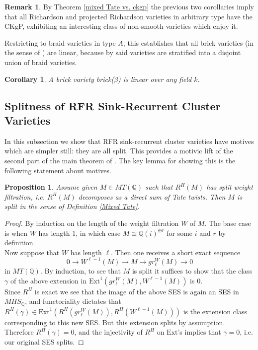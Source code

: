 \documentclass[11pt]{amsart}
\newtheorem{cor}[thm]{Corollary}
\newtheorem{prop}[thm]{Proposition}
\theoremstyle{definition}
\newtheorem{rem}[thm]{Remark}
\theoremstyle{remark}
\numberwithin{equation}{section}
\begin{document}
\begin{rem}
    By Theorem \ref{mixed Tate vs. ckgp} the previous two corollaries imply that all Richardson and projected Richardson varieties in arbitrary type have the CKgP, exhibiting an interesting class of non-smooth varieties which enjoy it.
\end{rem}

Restricting to braid varieties in type $A$, this establishes that all brick varieties (in the sense of \cite{MR3512647}) are linear, because by \cite{MR5110495} said varieties are stratified into a disjoint union of braid varieties.

\begin{cor}\label{last linear}
    A brick variety brick($\beta$) is linear over any field $k$.
\end{cor}

\subsection{Splitness of RFR Sink-Recurrent Cluster Varieties}\label{subsection 4.3}

In this subsection we show that RFR sink-recurrent cluster varieties have motives which are simpler still: they are all split. This provides a motivic lift of the second part of the main theorem of \cite{lam2022cohomology}. The key lemma for showing this is the following statement about motives.

\begin{prop}
       Assume given $M \in MT(\mathbb{Q})$ such that $R^H(M)$ has split weight filtration, i.e. $R^H(M)$ decomposes as a direct sum of Tate twists. Then $M$ is split in the sense of Definition \ref{Mixed Tate}.
\end{prop}

\begin{proof}
    By induction on the length of the weight filtration $W$ of $M$. The base case is when $W$ has length $1$, in which case $M \cong \mathbb{Q}(i)^{\oplus r}$ for some $i$ and $r$ by definition.\\
    
    Now suppose that $W$ has length $\ell$. Then one receives a short exact sequence \begin{equation}
        0 \rightarrow W^{\ell-1}(M) \rightarrow M \rightarrow gr_\ell^W(M) \rightarrow 0
\end{equation}\noindent in $MT(\mathbb{Q})$. By induction, to see that $M$ is split it suffices to show that the class $\gamma$ of the above extension in $\text{Ext}^1(gr_\ell^W(M), W^{\ell-1}(M))$ is $0$.\\

    Since $R^H$ is exact we see that the image of the above SES is again an SES in $MHS_\mathbb{Q}$, and functoriality dictates that $R^H(\gamma) \in \text{Ext}^1(R^H(gr_\ell^W(M)), R^H(W^{\ell-1}(M)))$ is the extension class corresponding to this new SES. But this extension splits by assumption. Therefore $R^H(\gamma) = 0$, and the injectivity of $R^H$ on $\text{Ext}$'s implies that $\gamma = 0$, i.e. our original SES splits.
\end{proof}
\end{document}
